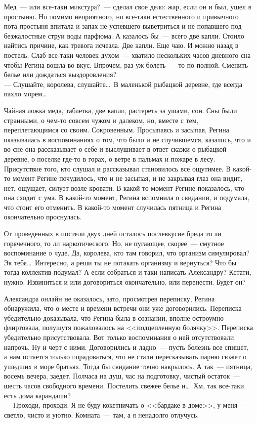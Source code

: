 Мед~--- или все-таки микстура?~--- сделал свое дело: жар, если он и был, ушел в 
простыню. Но помимо неприятного, но все-таки естественного и привычного пота 
простыня впитала и запах не успевшего выветриться и не попавшего под безжалостные 
струи воды парфюма. А казалось бы~--- всего две капли. Стоило найтись причине, 
как 
тревога исчезла. Две капли. Еще чаю. И можно назад в постель. Слаб все-таки 
человек духом~--- хватило нескольких часов дневного сна чтобы Регина вошла во 
вкус. Впрочем, раз уж болеть~--- то по полной. Сменить белье или дождаться 
выздоровления?\\
--- Слушайте, королева, слушайте\ldots\ В маленькой рыбацкой деревне, где всегда пахло морем\ldots

Чайная ложка меда, таблетка, две капли, растереть за ушами, сон. Сны были 
странными, о чем-то совсем чужом и далеком, но, вместе с тем, переплетающимся со 
своим. Сокровенным. Просыпаясь и засыпая, Регина оказывалась в воспоминаниях о 
том, что было и не случившемся, казалось, что и во сне она рассказывает о себе и 
выслушивает в ответ сказки о рыбацкой деревне, о поселке где-то в горах, о ветре 
в пальмах и пожаре в лесу. Присутствие того, кто слушал и рассказывал 
становилось все ощутимее. В какой-то момент Регине почудилось, что и не засыпая, 
и не закрывая глаз она видит, нет, ощущает, силуэт возле кровати. В какой-то 
момент Регине показалось, что она сходит с ума. В какой-то момент, Регина 
вспомнила о свидании, и подумала, что стоит его отменить. В какой-то момент 
случилась пятница и Регина окончательно проснулась.

От проведенных в постели двух дней осталось послевкусие бреда то ли горячечного, 
то ли наркотического. Но, не пугающее, скорее~--- смутное воспоминание о чуде. 
Да, 
королева, кто там говорил, что организм симулировал? Эк тебя\ldots\ Интересно, а 
реши ты не потакать организму и вернуться? Что бы тогда коллектив подумал? А 
если собраться и таки написать Александру? Кстати, нужно. Извиниться и или 
договориться окончательно, или перенести. Будет он?

Александра онлайн не оказалось, зато, просмотрев переписку, Регина обнаружила, 
что о месте и времени встречи они уже договорились. Переписка убедительно 
доказывала, что Регина была в сознании, вполне остроумно флиртовала, полушутя 
пожаловалось на <<подцепленную болячку>>. Переписка убедительно присутствовала. 
Вот только воспоминания о ней отсутствовали напрочь. Ну и черт с ними. 
Договорились и ладно~--- пусть болезнь все спишет, а нам остается только 
порадоваться, что не стали пересказывать парню сюжет о ушедших в море братьях. 
Тогда бы свидание точно накрылось. А так~--- пятница, восемь вечера, заедет. 
Полчаса на душ, час на подготовку, чистый остаток~--- шесть часов свободного 
времени. Постелить свежее белье и\ldots\ Хм, так все-таки есть дома карандаши?\\
--- Проходи, проходи. Я не буду кокетничать о <<бардаке в доме>>, у меня~--- 
светло, 
чисто и уютно. Комната~--- там, а я ненадолго отлучусь.

